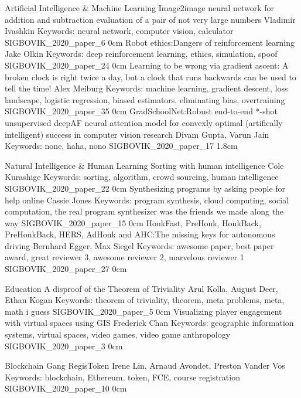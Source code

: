 \addtrack
	{}{Artificial Intelligence \& Machine Learning}
\addpaper
	{Image2image neural network for addition and subtraction evaluation of a pair of not very large numbers}
	{Vladimir Ivashkin}
	{Keywords: neural network, computer vision, calculator}
	{SIGBOVIK_2020_paper_6}
	{0cm}
	{}
\addpaper
	{Robot ethics:\@ Dangers of reinforcement learning}
	{Jake Olkin}
	{Keywords: deep reinforcement learning, ethics, simulation, spoof}
	{SIGBOVIK_2020_paper_24}
	{0cm}
	{}
\addpaper
	{Learning to be wrong via gradient ascent: A broken clock is right twice a day, but a clock that runs backwards can be used to tell the time!}
	{Alex Meiburg}
	{Keywords: machine learning, gradient descent, loss landscape, logistic regression, biased estimators, eliminating bias, overtraining}
	{SIGBOVIK_2020_paper_35}
	{0cm}
	{}
\addpaper
	{GradSchoolNet:\@ Robust end-to-end *-shot unsupervised deepAF neural attention model for convexly optimal (artifically intelligent) success in computer vision research}
	{Divam Gupta, Varun Jain}
	{Keywords: none, haha, nono}
	{SIGBOVIK_2020_paper_17}
	{1.8cm}
	{}

\addtrack
	{}{Natural Intelligence \& Human Learning}
\addpaper
	{Sorting with human intelligence}
	{Cole Kurashige}
	{Keywords: sorting, algorithm, crowd sourcing, human intelligence}
	{SIGBOVIK_2020_paper_22}
	{0cm}
	{}
\addpaper
	{Synthesizing programs by asking people for help online}
	{Cassie Jones}
	{Keywords: program synthesis, cloud computing, social computation, the real program synthesizer was the friends we made along the way}
	{SIGBOVIK_2020_paper_15}
	{0cm}
	{}
\addpaper
	{HonkFast, PreHonk, HonkBack, PreHonkBack, HERS, AdHonk and AHC:\@ The missing keys for autonomous driving}
	{Bernhard Egger, Max Siegel}
	{Keywords: awesome paper, best paper award, great reviewer 3, awesome reviewer 2, marvelous reviewer 1}
	{SIGBOVIK_2020_paper_27}
	{0cm}
	{}

\addtrack
	{}{Education}
\addpaper
	{A disproof of the Theorem of Triviality}
	{Arul Kolla, August Deer, Ethan Kogan}
	{Keywords: theorem of triviality, theorem, meta problems, meta, math i guess}
	{SIGBOVIK_2020_paper_5}
	{0cm}
	{}
\addpaper
	{Visualizing player engagement with virtual spaces using GIS}
	{Frederick Chan}
	{Keywords: geographic information systems, virtual spaces, video games, video game anthropology}
	{SIGBOVIK_2020_paper_3}
	{0cm}
	{}

\addtrack
	{}{Blockchain Gang}
\addpaper
	{RegisToken}
	{Irene Lin, Arnaud Avondet, Preston Vander Vos}
	{Keywords: blockchain, Ethereum, token, FCE, course registration}
	{SIGBOVIK_2020_paper_10}
	{0cm}
	{}

